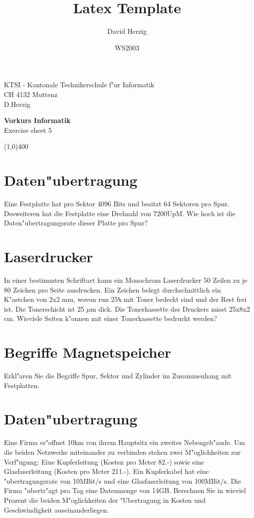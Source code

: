 \documentclass[a4paper,10pt]{article}
\title{Latex Template}
\author{David Herzig}
\date{WS2003}
\begin{document}
KTSI - Kantonale Technikerschule f"ur Informatik\\
CH 4132 Muttenz\\
D.Herzig

\vspace{2mm}

\begin{center}
{\Large \bf Vorkurs Informatik}\\
Exercise sheet 5
\end{center}

\vspace{2mm}

\line(1,0){400}

\vspace{5mm}

\section{Daten"ubertragung}
Eine Festplatte hat pro Sektor 4096 Bits und besitzt 64 Sektoren pro Spur. Desweiteren hat die Festplatte eine Drehzahl von 7200UpM. Wie hoch ist die Daten"ubertragungsrate dieser Platte pro Spur?

\section{Laserdrucker}
In einer bestimmten Schriftart kann ein Monochrom Laserdrucker 50 Zeilen zu je 80 Zeichen pro Seite ausdrucken. Ein Zeichen belegt durchschnittlich ein K"astchen von 2x2 mm, wovon run 25\verb|%| mit Toner bedeckt sind und der Rest frei ist. Die Tonerschicht ist 25 $\mu$m dick. Die Tonerkassette des Druckers misst 25x8x2 cm. Wieviele Seiten k"onnen mit einer Tonerkassette bedruckt werden?

\section{Begriffe Magnetspeicher}
Erkl"aren Sie die Begriffe Spur, Sektor und Zylinder im Zusammenhang mit Festplatten.

\section{Daten"ubertragung}
Eine Firma er"offnet 10km von ihrem Hauptsitz ein zweites Nebengeb"aude.
Um die beiden Netzwerke miteinander zu verbinden stehen zwei M"oglichkeiten zur Verf"ugung:
Eine Kupferleitung (Kosten pro Meter 82.-) sowie eine Glasfaserleitung (Kosten pro Meter 211.-).
Ein Kupferkabel hat eine "ubertragungsrate von 10MBit/s und eine Glasfaserleitung von 100MBit/s.
Die Firma "ubertr"agt pro Tag eine Datenmenge von 14GB. Berechnen Sie in wieviel Prozent die
beiden M"oglichkeiten der "Ubertragung in Kosten und Geschwindigkeit auseinanderliegen.
\end{document}
